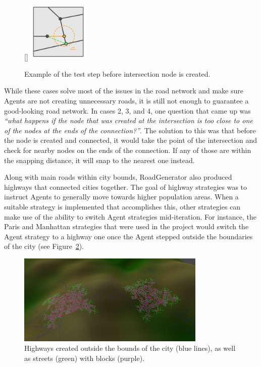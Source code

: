 \begin{figure}
  \centering
  \raisebox{0pt}[\dimexpr{}\baselineskip\relax]{
    \includegraphics[width=0.26\textwidth]{figure/road_intersection_final_test.png}
  }
  \caption{Example of the test step before intersection node is created.}

  \label{fig:road_intersection_final_test}
\end{figure}

While these cases solve most of the issues in the road network and make sure Agents are not creating unnecessary roads, it is still not enough to guarantee a good-looking road network.
In cases 2, 3, and 4, one question that came up was \textit{``what happens if the node that was created at the intersection is too close to one of the nodes at the ends of the connection?''}.
The solution to this was that before the node is created and connected, it would take the point of the intersection and check for nearby nodes on the ends of the connection.
If any of those are within the snapping distance, it will snap to the nearest one instead.


Along with main roads within city bounds, RoadGenerator also produced highways that connected cities together.
The goal of highway strategies was to instruct Agents to generally move towards higher population areas.
When a suitable strategy is implemented that accomplishes this, other strategies can make use of the ability to switch Agent strategies mid-iteration.
For instance, the Paris and Manhattan strategies that were used in the project would switch the Agent strategy to a highway one once the Agent stepped outside the boundaries of the city (see Figure~\ref{fig:road_highways}).

\begin{figure}[H]
  \centering

  \includegraphics[width=0.8\textwidth]{figure/road_highways.png}
  \caption{Highways created outside the bounds of the city (blue lines), as well as streets (green) with blocks (purple).}

  \label{fig:road_highways}
\end{figure}

